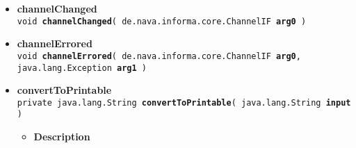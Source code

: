 {{{\begin{itemize}
{\begin{itemize}
{Message reception handler. It is called on the object implementing this interface which was set in AirBrush.
}
\item{
{\bf Parameters}
  \begin{itemize}
   \item{
{\tt msg} -- }
  \end{itemize}
}%
\item{{\bf Returns} -- 
true if the message was handled, false if it wasn't 
}%
\item{{\bf See also}
  \begin{itemize}
\item{ {\tt amber.common.AirBrush.setCallbackObject(AirBrushCallable)} {\small 
{}}%
}
  \end{itemize}
}%
\end{itemize}
}%
 \item{ 
{\bf channelChanged}\\
{\tt  void\ {\bf channelChanged}( {\tt de.nava.informa.core.ChannelIF} {\bf arg0} )
\label{amber.crawler.RSS.channelChanged(de.nava.informa.core.ChannelIF)}}%
}%
 \item{ 
{\bf channelErrored}\\
{\tt  void\ {\bf channelErrored}( {\tt de.nava.informa.core.ChannelIF} {\bf arg0},
{\tt java.lang.Exception} {\bf arg1} )
\label{amber.crawler.RSS.channelErrored(de.nava.informa.core.ChannelIF, java.lang.Exception)}}%
}%
 \item{ 
{\bf convertToPrintable}\\
{\tt private java.lang.String\ {\bf convertToPrintable}( {\tt java.lang.String} {\bf input} )
\label{amber.crawler.RSS.convertToPrintable(java.lang.String)}}%
\begin{itemize}
\item{
{\bf Description}

}
\end{itemize}}
\end{itemize}}}}
